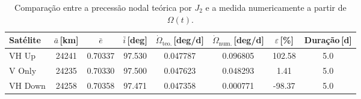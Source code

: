 \begin{table}[ht]
\centering
\caption{Comparação entre a precessão nodal teórica por $J_2$ e a medida numericamente a partir de $\Omega(t)$.}
\label{tab:raan_j2_comp}
\begin{tabular}{l S[table-format=5.0] S[table-format=1.5] S[table-format=3.3] S[table-format=1.6] S[table-format=1.6] S[table-format=+2.2] S[table-format=2.1]}
\toprule
Satélite & {$\bar{a}$\,[km]} & {$\bar{e}$} & {$\bar{i}$\,[deg]} & {$\dot{\Omega}_{\text{teo.}}$\,[deg/d]} & {$\dot{\Omega}_{\text{num.}}$\,[deg/d]} & {$\varepsilon$\,[\%]} & {Duração\,[d]} \\
\midrule
VH Up & 24241 & 0.70337 & 97.530 & 0.047787 & 0.096805 & 102.58 & 5.0 \\
V Only & 24235 & 0.70330 & 97.500 & 0.047623 & 0.048293 & 1.41 & 5.0 \\
VH Down & 24258 & 0.70358 & 97.471 & 0.047358 & 0.000771 & -98.37 & 5.0 \\
\bottomrule
\end{tabular}
\end{table}